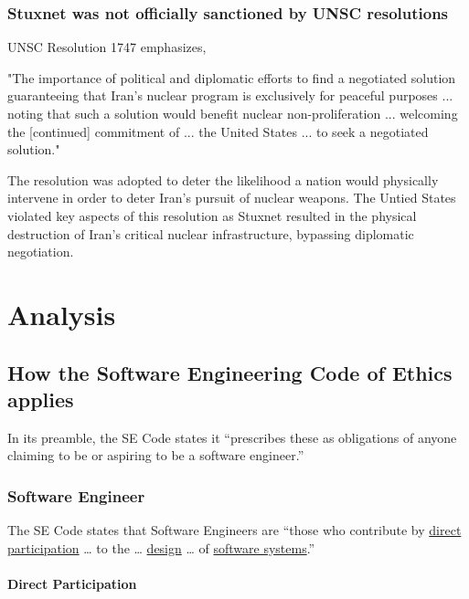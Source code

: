 \documentclass[12pt]{article}
\begin{document}
\begin{multicols}{2}
\subsubsection{Stuxnet was not officially sanctioned by UNSC resolutions}

UNSC Resolution 1747 emphasizes,
\begin{displayquote}
"The importance of political and diplomatic efforts to find a negotiated solution guaranteeing that Iran’s nuclear program is exclusively for peaceful purposes ... noting that such a solution would benefit nuclear non-proliferation ... welcoming the [continued] commitment of ... the United States ... to seek a negotiated solution."\cite{resolution1747}
\end{displayquote}

The resolution was adopted to deter the likelihood a nation would physically intervene in order to deter Iran's pursuit of nuclear weapons. The Untied States violated key aspects of this resolution as Stuxnet resulted in the physical destruction of Iran's critical nuclear infrastructure, bypassing diplomatic negotiation.


\section{Analysis}

\subsection{How the Software Engineering Code of Ethics applies}

In its preamble, the SE Code states it “prescribes these as obligations of anyone claiming to be or aspiring to be a software engineer.”\cite{softwareEngineeringCodeOfEthics}

\subsubsection{Software Engineer}

The SE Code states that Software Engineers are “those who contribute by \underline{direct participation} … to the … \underline{design} … of \underline{software systems}.”\cite{softwareEngineeringCodeOfEthics}

\paragraph{Direct Participation}


\end{multicols}
\end{document}

